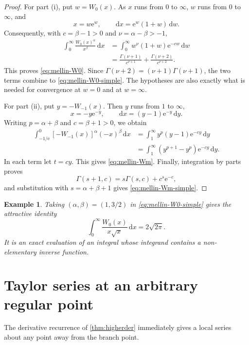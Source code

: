 \documentclass[11pt]{article}
\newtheorem{example}[example]{Example}
\theoremstyle{remark}
\newcommand{\Wz}{W_0}
\newcommand{\Wm}{W_{-1}}
\newcommand{\ee}{\mathrm e}
\newcommand{\dd}{\,\mathrm d}
\begin{document}
\begin{proof}
For part (i), put \(w=\Wz(x)\).  As \(x\) runs from \(0\) to
\(\infty\), \(w\) runs from \(0\) to \(\infty\), and
\[
 x=w\ee^w,\qquad \dd x=\ee^w(1+w)\dd w.
\]
Consequently, with \(c=\beta-1>0\) and
\(\nu=\alpha-\beta>-1\),
\begin{align*}
 \int_0^\infty \frac{\Wz(x)^\alpha}{x^\beta}\dd x
 &=\int_0^\infty w^\nu(1+w)\ee^{-cw}\dd w\\
 &=\frac{\Gamma(\nu+1)}{c^{\nu+1}}
   +\frac{\Gamma(\nu+2)}{c^{\nu+2}}.
\end{align*}
This proves \eqref{eq:mellin-W0}.  Since
\(\Gamma(\nu+2)=(\nu+1)\Gamma(\nu+1)\), the two terms combine to
\eqref{eq:mellin-W0-simple}.  The hypotheses are also exactly what is
needed for convergence at \(w=0\) and at \(w=\infty\).

For part (ii), put \(y=-\Wm(x)\).  Then \(y\) runs from \(1\) to
\(\infty\),
\[
       x=-y\ee^{-y},\qquad
       \dd x=(y-1)\ee^{-y}\dd y.
\]
Writing \(p=\alpha+\beta\) and \(c=\beta+1>0\), we obtain
\begin{align*}
 \int_{-1/\ee}^{0}[-\Wm(x)]^\alpha(-x)^\beta\dd x
 &=\int_1^\infty y^p(y-1)\ee^{-cy}\dd y\\
 &=\int_1^\infty
   \left(y^{p+1}-y^p\right)\ee^{-cy}\dd y.
\end{align*}
In each term let \(t=cy\).  This gives \eqref{eq:mellin-Wm}.
Finally, integration by parts proves
\[
       \Gamma(s+1,c)=s\Gamma(s,c)+c^s\ee^{-c},
\]
and substitution with \(s=\alpha+\beta+1\) gives
\eqref{eq:mellin-Wm-simple}.
\end{proof}

\begin{example}
Taking \((\alpha,\beta)=(1,3/2)\) in
\eqref{eq:mellin-W0-simple} gives the attractive identity
\begin{equation}\label{eq:classic-mellin-example}
       \int_0^\infty\frac{\Wz(x)}{x\sqrt{x}}\dd x
       =2\sqrt{2\pi}.
\end{equation}
It is an exact evaluation of an integral whose integrand contains a
non-elementary inverse function.
\end{example}

\section{Taylor series at an arbitrary regular point}\label{sec:localTaylor}

The derivative recurrence of \cref{thm:higherder} immediately gives a local
series about any point away from the branch point.
\end{document}
